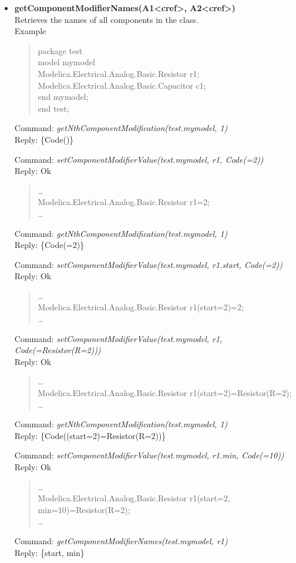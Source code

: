 \documentclass[11pt,a4paper,oneside,english]{book}
\newenvironment{modelicaExamples}{\begin{itemize}}{\end{itemize}}
\newcommand{\api}[2]{\item \textbf{#1} \\ #2}
\newcommand{\tab}{\hspace{2em}}
\newcommand{\command}[1]{Command: \textit{#1}\\}
\newcommand{\reply}[1]{Reply: #1}
\newcommand{\functionex}[2]{\begin{singlespace} \command{#1} \reply{#2} \end{singlespace}}
\newcommand{\examples}{Example}
\newenvironment{mocode}{\begin{verse}\begin{singlespace}\begin{scriptsize}\ttfamily}{\end{scriptsize}\end{singlespace}\end{verse}}
\begin{document}
\begin{modelicaExamples}
			\api{getComponentModifierNames(A1<cref>, A2<cref>)}{Retrieves the names of all components in the class.}\\
			\examples
			\begin{mocode}
			package test\\
			\tab model mymodel\\
			\tab\tab Modelica.Electrical.Analog.Basic.Resistor r1;\\
			\tab\tab Modelica.Electrical.Analog.Basic.Capacitor c1;\\
			\tab end mymodel;\\
			end test;\\
			\end{mocode}
			\functionex{getNthComponentModification(test.mymodel, 1)}
			{\{Code()\}}
			
			\functionex{setComponentModifierValue(test.mymodel, r1, Code(=2))}
			{Ok}
			
			\begin{mocode}
			\dots \\
			Modelica.Electrical.Analog.Basic.Resistor r1=2;\\
			\dots \\
			\end{mocode}
			\functionex{getNthComponentModification(test.mymodel, 1)}
			{\{Code(=2)\}}
			
			\functionex{setComponentModifierValue(test.mymodel, r1.start, Code(=2))}
			{Ok}
			
			\begin{mocode}
			\dots \\
			Modelica.Electrical.Analog.Basic.Resistor r1(start=2)=2;\\
			\dots \\
			\end{mocode}
			\functionex{setComponentModifierValue(test.mymodel, r1, Code(=Resistor(R=2)))}
			{Ok}
			
			\begin{mocode}
			\dots \\
			Modelica.Electrical.Analog.Basic.Resistor r1(start=2)=Resistor(R=2);\\
			\dots \\
			\end{mocode}
			\functionex{getNthComponentModification(test.mymodel, 1)}
			{\{Code((start=2)=Resistor(R=2))\}}
			
			\functionex{setComponentModifierValue(test.mymodel, r1.min, Code(=10))}
			{Ok}
			
			\begin{mocode}
			\dots \\
			Modelica.Electrical.Analog.Basic.Resistor r1(start=2, min=10)=Resistor(R=2);\\
			\dots \\
			\end{mocode}
			\functionex{getComponentModifierNames(test.mymodel, r1)}
			{\{start, min\}}
			

\end{modelicaExamples}
\end{document}
